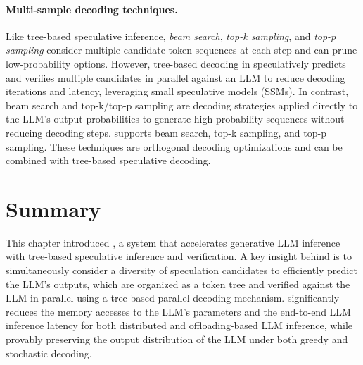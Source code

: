 \paragraph{Multi-sample decoding techniques.}
Like tree-based speculative inference, \textit{beam search}, \textit{top-k sampling}, and \textit{top-p sampling} consider multiple candidate token sequences at each step and can prune low-probability options. However, tree-based decoding in \SpecInfer speculatively predicts and verifies multiple candidates in parallel against an LLM to reduce decoding iterations and latency, leveraging small speculative models (SSMs). In contrast, beam search and top-k/top-p sampling are decoding strategies applied directly to the LLM's output probabilities to generate high-probability sequences without reducing decoding steps. \SpecInfer supports beam search, top-k sampling, and top-p sampling. These techniques are orthogonal decoding optimizations and can be combined with tree-based speculative decoding.

\section{Summary}
\label{specinfer:sec:summary}
This chapter introduced \SpecInfer, a system that accelerates generative LLM inference with tree-based speculative inference and verification.
A key insight behind \SpecInfer is to simultaneously consider a diversity of speculation candidates to efficiently predict the LLM's outputs, which are organized as a token tree and verified against the LLM in parallel using a tree-based parallel decoding mechanism.
\SpecInfer significantly reduces the memory accesses to the LLM's parameters and the end-to-end LLM inference latency for both distributed and offloading-based LLM inference, while provably preserving the output distribution of the LLM under both greedy and stochastic decoding.
